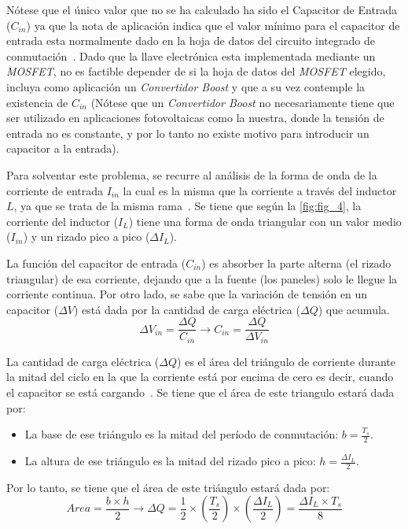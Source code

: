 \documentclass[12pt,a4paper]{article}
\begin{document}
Nótese que el único valor que no se ha calculado ha sido el Capacitor de Entrada ($C_{in}$) ya que la nota de aplicación indica que el valor mínimo para el capacitor de entrada esta normalmente dado en la hoja de datos del circuito integrado de conmutación~\cite{b5}. Dado que la llave electrónica esta implementada mediante un \textit{MOSFET}, no es factible depender de si la hoja de datos del \textit{MOSFET} elegido, incluya como aplicación un \textit{Convertidor Boost} y que a su vez contemple la existencia de $C_{in}$ (Nótese que un \textit{Convertidor Boost} no necesariamente tiene que ser utilizado en aplicaciones fotovoltaicas como la nuestra, donde la tensión de entrada no es constante, y por lo tanto no existe motivo para introducir un capacitor a la entrada).

Para solventar este problema, se recurre al análisis de la forma de onda de la corriente de entrada $I_{in}$ la cual es la misma que la corriente a través del inductor $L$, ya que se trata de la misma rama~\cite{b8}. Se tiene que según la \autoref{fig:fig_4}, la corriente del inductor ($I_{L}$) tiene una forma de onda triangular con un valor medio ($I_{in}$) y un rizado pico a pico ($\Delta I_L$).

La función del capacitor de entrada ($C_{in}$) es absorber la parte alterna (el rizado triangular) de esa corriente, dejando que a la fuente (los paneles) solo le llegue la corriente continua. Por otro lado, se sabe que la variación de tensión en un capacitor ($\Delta V$) está dada por la cantidad de carga eléctrica ($\Delta Q$) que acumula.
\begin{equation}
    \Delta V_{in} = \frac{\Delta Q}{C_{in}} \rightarrow C_{in} = \frac{\Delta Q}{\Delta V_{in}}
    \label{eq_9}
\end{equation}

La cantidad de carga eléctrica ($\Delta Q$) es el área del triángulo de corriente durante la mitad del ciclo en la que la corriente está por encima de cero es decir, cuando el capacitor se está cargando~\cite{b8}. Se tiene que el área de este triangulo estará dada por:
\begin{itemize}
    \item La base de ese triángulo es la mitad del período de conmutación: $b = \frac{T_s}{2}$.
    \item La altura de ese triángulo es la mitad del rizado pico a pico: $h = \frac{\Delta I_L}{2}$.
\end{itemize}

Por lo tanto, se tiene que el área de este triángulo estará dada por:
\begin{equation}
    Area = \frac{b \times h}{2} \rightarrow \Delta Q = \frac{1}{2} \times \left(\frac{T_{s}}{2}\right) \times \left(\frac{\Delta I_L}{2}\right) = \frac{\Delta I_L \times T_s}{8} 
    \label{eq_10}
\end{equation}
\end{document}

